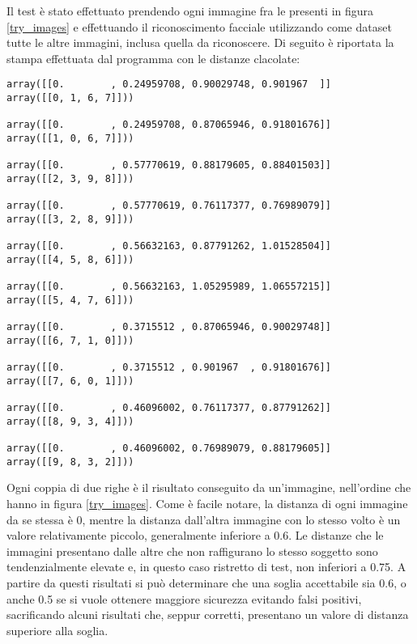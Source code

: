 Il test è stato effettuato prendendo ogni immagine fra le presenti in figura \ref{try_images} e effettuando il riconoscimento facciale utilizzando come dataset tutte le altre immagini, inclusa quella da riconoscere. Di seguito è riportata la stampa effettuata dal programma con le distanze clacolate:
\begin{lstlisting}
array([[0.        , 0.24959708, 0.90029748, 0.901967  ]] 
array([[0, 1, 6, 7]]))

array([[0.        , 0.24959708, 0.87065946, 0.91801676]]
array([[1, 0, 6, 7]]))

array([[0.        , 0.57770619, 0.88179605, 0.88401503]]
array([[2, 3, 9, 8]]))

array([[0.        , 0.57770619, 0.76117377, 0.76989079]]
array([[3, 2, 8, 9]]))

array([[0.        , 0.56632163, 0.87791262, 1.01528504]]
array([[4, 5, 8, 6]]))

array([[0.        , 0.56632163, 1.05295989, 1.06557215]]
array([[5, 4, 7, 6]]))

array([[0.        , 0.3715512 , 0.87065946, 0.90029748]]
array([[6, 7, 1, 0]]))

array([[0.        , 0.3715512 , 0.901967  , 0.91801676]]
array([[7, 6, 0, 1]]))

array([[0.        , 0.46096002, 0.76117377, 0.87791262]]
array([[8, 9, 3, 4]]))

array([[0.        , 0.46096002, 0.76989079, 0.88179605]]
array([[9, 8, 3, 2]]))

\end{lstlisting}
Ogni coppia di due righe è il risultato conseguito da un'immagine, nell'ordine che hanno in figura \ref{try_images}. Come è facile notare, la distanza di ogni immagine da se stessa è 0, mentre la distanza dall'altra immagine con lo stesso volto è un valore relativamente piccolo, generalmente inferiore a 0.6. Le distanze che le immagini presentano dalle altre che non raffigurano lo stesso soggetto sono tendenzialmente elevate e, in questo caso ristretto di test, non inferiori a 0.75. A partire da questi risultati si può determinare che una soglia accettabile sia 0.6, o anche 0.5 se si vuole ottenere maggiore sicurezza evitando falsi positivi, sacrificando alcuni risultati che, seppur corretti, presentano un valore di distanza superiore alla soglia. 









